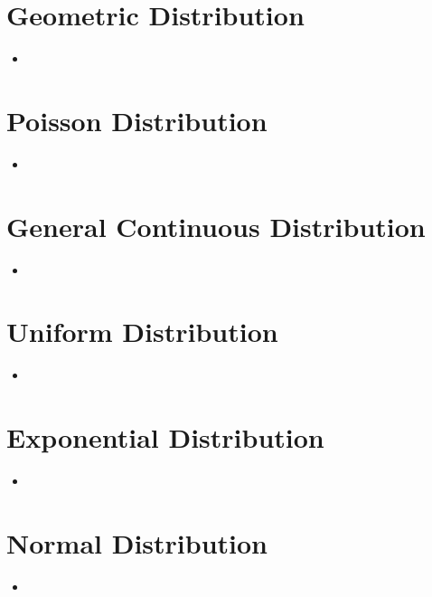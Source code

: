 \documentclass[8pt]{report}
\begin{document}
	\section{Geometric Distribution}
		\begin{itemize}
				\item
			\end{itemize}\hrulefill
	\section{Poisson Distribution}
		\begin{itemize}
				\item
			\end{itemize}\hrulefill
	\section{General Continuous Distribution}
		\begin{itemize}
				\item
			\end{itemize}\hrulefill
	\section{Uniform Distribution}
		\begin{itemize}
				\item
			\end{itemize}\hrulefill
	\section{Exponential Distribution}
		\begin{itemize}
				\item
			\end{itemize}\hrulefill
	\section{Normal Distribution}
		\begin{itemize}
				\item
			\end{itemize}\hrulefill
\end{document}
